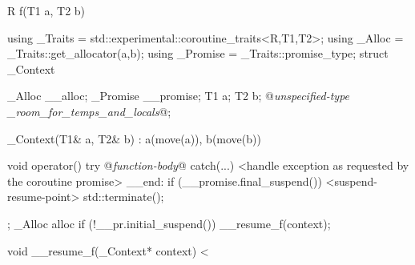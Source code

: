 \begin{codeblock}
	R f(T1 a, T2 b) {
		using _Traits = std::experimental::coroutine_traits<R,T1,T2>;
		using _Alloc = _Traits::get_allocator(a,b);
		using _Promise = _Traits::promise_type;
		struct _Context {
			_Alloc __alloc;
			_Promise __promise;
			T1 a;
			T2 b;
			@\textit{unspecified-type _room_for_temps_and_locals}@;
			
			_Context(T1& a, T2& b) : a(move(a)), b(move(b)) {}
			
			void operator() {
				try { 
					@\textit{function-body}@ 
				} catch(...) {
					<handle exception as requested by the coroutine promise>
				}
				__end:  
				if (__promise.final_suspend()) {
					<suspend-resume-point>
					std::terminate();
				}			
			}
		};
		_Alloc alloc
		if (!__pr.initial_suspend()) {
			__resume_f(context);
		}
	}
	
	void __resume_f(_Context* context) {
	<
}
\end{codeblock}

%
